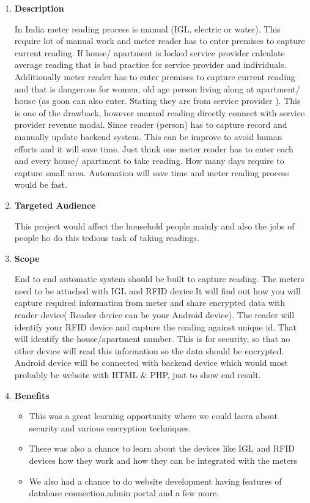 \documentclass[fleqn,10pt]{../SelfArx} %
\begin{document}
\vspace{0.5cm}
\begin{enumerate}
\item \textbf{Description}


In India meter reading process is manual (IGL, electric or water). This require lot of manual work and meter reader has to enter premises to capture current reading.
If house/ apartment is locked service provider calculate average reading that is bad practice for service provider and individuals.
Additionally meter reader has to enter premises to capture current reading and that is dangerous for women, old age person living along at apartment/ house (as goon can also enter. Stating they are from service provider ). This is one of the drawback, however manual reading directly connect with service provider revenue modal. Since reader (person) has to capture record and manually update backend system. This can be improve to avoid human efforts and it will save time.
Just think one meter reader has to enter each and every house/ apartment to take reading. How many days require to capture small area. Automation will save time and meter reading process would be fast.

\item \textbf{Targeted Audience}

This project would affect the household people mainly and also the jobs of people ho do this tedious task of taking readings.

\item \textbf{ Scope}


End to end automatic system should be built to capture reading. The meters need to be attached with IGL and RFID device.It will find out how you will capture required information from meter and share encrypted data with reader device( Reader device can be your Android device). The reader will identify your RFID device and capture the reading against unique id. That will identify the house/apartment number. This is for security, so that no other device will read this information so the data should be encrypted. Android device will be connected with  backend device which would most probably be  website with HTML & PHP, just to show end result.

\item \textbf{Benefits}
\begin{itemize}
    \item This was a great learning opportunity where we could laern about security and various encryption techniques.
    \item There was also a chance to learn about the devices like IGL and RFID devices how they work and how they can be integrated with the meters
    \item We also had a chance to do website development having features of database connection,admin portal and a few more.
\end{itemize}


\end{enumerate}
\end{document}
